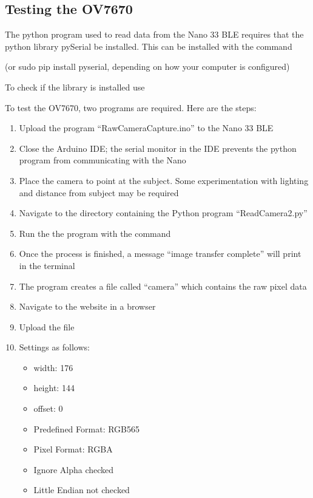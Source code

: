 \subsection{Testing the OV7670}
        
The python program used to read data from the Nano 33 BLE requires that the python library pySerial be installed. This can be installed with the command


(or sudo pip install pyserial, depending on how your computer is configured)

To check if the library is installed use


To test the OV7670, two programs are required. Here are the steps:

\begin{enumerate}
  \item Upload the program “RawCameraCapture.ino” to the Nano 33 BLE
  \item Close the Arduino IDE; the serial monitor in the IDE prevents the python program from communicating with the Nano
  \item Place the camera to point at the subject. Some experimentation with lighting and distance from subject may be required
  \item Navigate to the directory containing the Python program “ReadCamera2.py”
  \item Run the the program with the command
  
  \item Once the process is finished, a message “image transfer complete” will print in the terminal
  \item The program creates a file called “camera” which contains the raw pixel data
  \item Navigate to the website  in a browser
  \item Upload the file 
  \item Settings as follows:
    \begin{itemize}
      \item width: 176
      \item height: 144
      \item offset: 0
      \item Predefined Format: RGB565
      \item Pixel Format: RGBA
      \item Ignore Alpha checked
      \item Little Endian not checked
    \end{itemize}
\end{enumerate}

